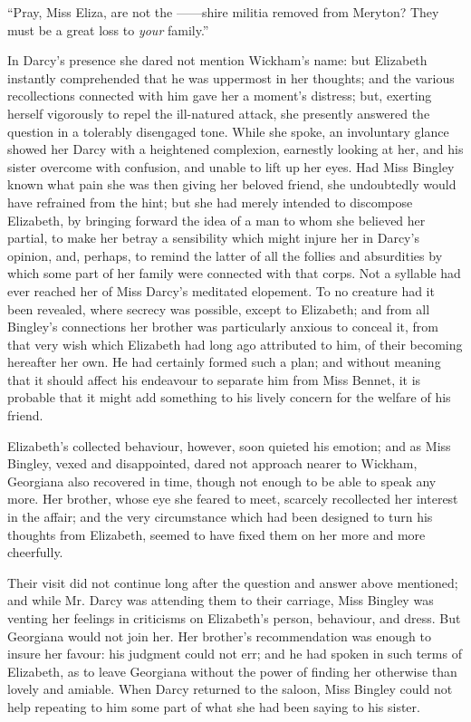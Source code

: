 \documentclass[12pt,openright]{book}
\begin{document}
“Pray, Miss Eliza, are not the ——shire militia removed from Meryton? They must be a great loss to \textit{your} family.”

In Darcy’s presence she dared not mention Wickham’s name: but Elizabeth instantly comprehended that he was uppermost in her thoughts; and the various recollections connected with him gave her a moment’s distress; but, exerting herself vigorously to repel the ill-natured attack, she presently answered the question in a tolerably disengaged tone. While she spoke, an involuntary glance showed her Darcy with a heightened complexion, earnestly looking at her, and his sister overcome with confusion, and unable to lift up her eyes. Had Miss Bingley known what pain she was then giving her beloved friend, she undoubtedly would have refrained from the hint; but she had merely intended to discompose Elizabeth, by bringing forward the idea of a man to whom she believed her partial, to make her betray a sensibility which might injure her in Darcy’s opinion, and, perhaps, to remind the latter of all the follies and absurdities by which some part of her family were connected with that corps. Not a syllable had ever reached her of Miss Darcy’s meditated elopement. To no creature had it been revealed, where secrecy was possible, except to Elizabeth; and from all Bingley’s connections her brother was particularly anxious to conceal it, from that very wish which Elizabeth had long ago attributed to him, of their becoming hereafter her own. He had certainly formed such a plan; and without meaning that it should affect his endeavour to separate him from Miss Bennet, it is probable that it might add something to his lively concern for the welfare of his friend.

Elizabeth’s collected behaviour, however, soon quieted his emotion; and as Miss Bingley, vexed and disappointed, dared not approach nearer to Wickham, Georgiana also recovered in time, though not enough to be able to speak any more. Her brother, whose eye she feared to meet, scarcely recollected her interest in the affair; and the very circumstance which had been designed to turn his thoughts from Elizabeth, seemed to have fixed them on her more and more cheerfully.

Their visit did not continue long after the question and answer above mentioned; and while Mr. Darcy was attending them to their carriage, Miss Bingley was venting her feelings in criticisms on Elizabeth’s person, behaviour, and dress. But Georgiana would not join her. Her brother’s recommendation was enough to insure her favour: his judgment could not err; and he had spoken in such terms of Elizabeth, as to leave Georgiana without the power of finding her otherwise than lovely and amiable. When Darcy returned to the saloon, Miss Bingley could not help repeating to him some part of what she had been saying to his sister.
\end{document}
